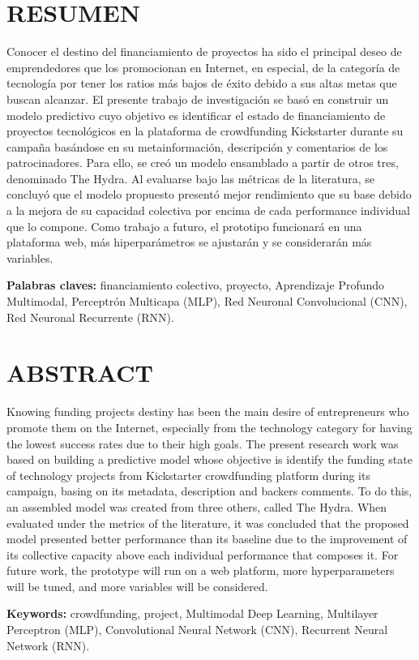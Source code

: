 
\chapter*{RESUMEN}

Conocer el destino del financiamiento de proyectos ha sido el principal deseo de emprendedores que los promocionan en Internet, en especial, de la categoría de tecnología por tener los ratios más bajos de éxito debido a sus altas metas que buscan alcanzar. El presente trabajo de investigación se basó en construir un modelo predictivo cuyo objetivo es identificar el estado de financiamiento de proyectos tecnológicos en la plataforma de crowdfunding Kickstarter durante su campaña basándose en su metainformación, descripción y comentarios de los patrocinadores. Para ello, se creó un modelo ensamblado a partir de otros tres, denominado The Hydra. Al evaluarse bajo las métricas de la literatura, se concluyó que el modelo propuesto presentó mejor rendimiento que su base debido a la mejora de su capacidad colectiva por encima de cada performance individual que lo compone. Como trabajo a futuro, el prototipo funcionará en una plataforma web, más hiperparámetros se ajustarán y se considerarán más variables.

\textbf{Palabras claves: } financiamiento colectivo, proyecto, Aprendizaje Profundo Multimodal, Perceptrón Multicapa (MLP), Red Neuronal Convolucional (CNN), Red Neuronal Recurrente (RNN).

\clearpage
\chapter*{ABSTRACT}
Knowing funding projects destiny has been the main desire of entrepreneurs who promote them on the Internet, especially from the technology category for having the lowest success rates due to their high goals. The present research work was based on building a predictive model whose objective is identify the funding state of technology projects from Kickstarter crowdfunding platform during its campaign, basing on its metadata, description and backers comments. To do this, an assembled model was created from three others, called The Hydra. When evaluated under the metrics of the literature, it was concluded that the proposed model presented better performance than its baseline due to the improvement of its collective capacity above each individual performance that composes it. For future work, the prototype will run on a web platform, more hyperparameters will be tuned, and more variables will be considered.

\textbf{Keywords: } crowdfunding, project, Multimodal Deep Learning, Multilayer Perceptron (MLP), Convolutional Neural Network (CNN), Recurrent Neural Network (RNN).